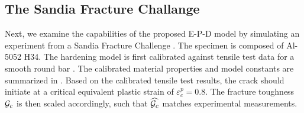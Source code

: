 

\subsection{The Sandia Fracture Challange}
\label{section: Chapter5/examples/SFC}

Next, we examine the capabilities of the proposed E-P-D model by simulating an experiment from a Sandia Fracture Challenge \cite{boyce2014sandia}.  The specimen is composed of Al-5052 H34.  The hardening model is first calibrated against  tensile test data for a smooth round bar \cite{guo2013experimental}. The calibrated material properties and model constants are summarized in . Based on the calibrated tensile test results, the crack should initiate at a critical equivalent plastic strain of $\varepsilon^p_c = 0.8$. The fracture toughness ${\mathcal{G}_c}$ is then scaled accordingly, such that $\widehat{{\mathcal{G}_c}}$ matches experimental measurements.

